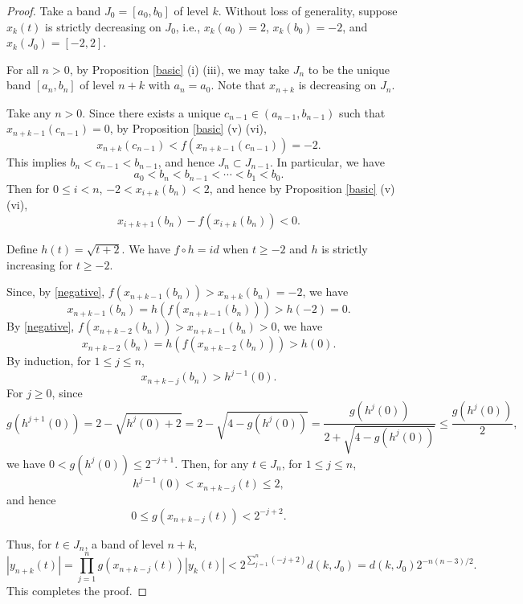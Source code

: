\documentclass{amsart}
\theoremstyle{definition}
\begin{document}
\begin{proof}
Take a band $J_0=[a_0,b_0]$ of level $k$.
Without loss of generality, suppose $x_k(t)$ is strictly decreasing on $J_0$,
i.e., $x_k(a_0)=2$, $x_k(b_0)=-2$, and $x_k(J_0)=[-2,2]$.

For all $n>0$,
by Proposition \ref{basic} (i) (iii),  
we may take $J_{n}$ to be the unique band $[a_n,b_n]$ of level $n+k$ with $a_n=a_0$.
Note that $x_{n+k}$ is decreasing on $J_n$.

Take any $n>0$.
Since there exists a unique $c_{n-1}\in(a_{n-1},b_{n-1})$ such that $x_{n+k-1}(c_{n-1})=0$, 
by Proposition \ref{basic} (v) (vi), 
$$x_{n+k}(c_{n-1})<f(x_{n+k-1}(c_{n-1}))=-2.$$
This implies $b_{n}<c_{n-1}<b_{n-1}$, and hence $J_{n}\subset J_{n-1}$.
In particular, we have
$$%
a_0<b_n<b_{n-1}<\cdots<b_{1}<b_0.
$$%
Then for $0\le i<n$, $-2<x_{i+k}(b_n)<2$, and hence by Proposition \ref{basic} (v) (vi), 
\begin{equation}\label{negative}
x_{i+k+1}(b_n)-f(x_{i+k}(b_n))<0.
\end{equation}

Define $h(t)=\sqrt{t+2}$. We have $f\circ h=id$ when $t\ge-2$ and $h$ is strictly increasing for $t\ge-2$. 

Since, by \eqref{negative}, $f(x_{n+k-1}(b_n))>x_{n+k}(b_n)=-2$, we have 
$$x_{n+k-1}(b_n)=h(f(x_{n+k-1}(b_n)))>h(-2)=0.$$
By \eqref{negative}, $f(x_{n+k-2}(b_n))>x_{n+k-1}(b_n)>0$, we have
$$x_{n+k-2}(b_n)=h(f(x_{n+k-2}(b_n)))>h(0).$$
By induction, for $1\le j\le n$,
$$x_{n+k-j}(b_n)>h^{j-1}(0).$$
For $j\ge0$, since
\begin{equation*}
g(h^{j+1}(0))=2-\sqrt{h^j(0)+2}=2-\sqrt{4-g(h^j(0))}
    =\frac{g(h^j(0))}{2+\sqrt{4-g(h^j(0))}}\le\frac{g(h^j(0))}{2},
\end{equation*}
we have $0< g(h^j(0))\le 2^{-j+1}$.
Then, for any $t\in J_n$, for $1\le j\le n$,
\begin{equation*}
h^{j-1}(0)< x_{n+k-j}(t)\le 2,
\end{equation*}
and hence
$$0\le g(x_{n+k-j}(t))<2^{-j+2}.$$

Thus, for $t\in J_n$, a band of level $n+k$,
\begin{equation*}
|y_{n+k}(t)|=\prod_{j=1}^{n}g(x_{n+k-j}(t))|y_k(t)| <
2^{\sum_{j=1}^{n}(-j+2)}d(k,J_0)=d(k,J_0)2^{-n(n-3)/2}.
\end{equation*}
This completes the proof.
\end{proof}
\end{document}
